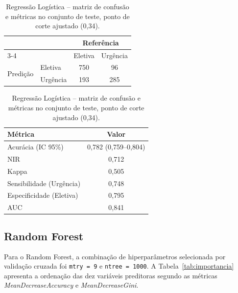 \documentclass[12pt,a4paper]{article}
\begin{document}
\begin{table}[H]
\centering
\caption{Regressão Logística -- matriz de confusão e métricas no conjunto de teste, ponto de corte ajustado (0,34).}
\label{tab:glm_ajustado}
\begin{tabular}{llcc}
\toprule
& & \multicolumn{2}{c}{Referência} \\
\cmidrule(lr){3-4}
& & Eletiva & Urgência \\
\midrule
\multirow{2}{*}{Predição} & Eletiva & 750 & 96 \\
& Urgência & 193 & 285 \\
\bottomrule
\end{tabular}
\hspace{1.2cm}
\begin{tabular}{lc}
\toprule
Métrica & Valor \\
\midrule
Acurácia (IC 95\%) & 0,782 (0,759--0,804) \\
NIR & 0,712 \\
Kappa & 0,505 \\
Sensibilidade (Urgência) & 0,748 \\
Especificidade (Eletiva) & 0,795 \\
AUC & 0,841 \\
\bottomrule
\end{tabular}
\end{table}

\subsection{Random Forest}
\label{sec:resultados_rf}

Para o Random Forest, a combinação de hiperparâmetros selecionada por validação cruzada foi \texttt{mtry = 9} e \texttt{ntree = 1000}. A Tabela~\ref{tab:importancia} apresenta a ordenação das dez variáveis preditoras segundo as métricas \textit{MeanDecreaseAccuracy} e \textit{MeanDecreaseGini}.
\end{document}
